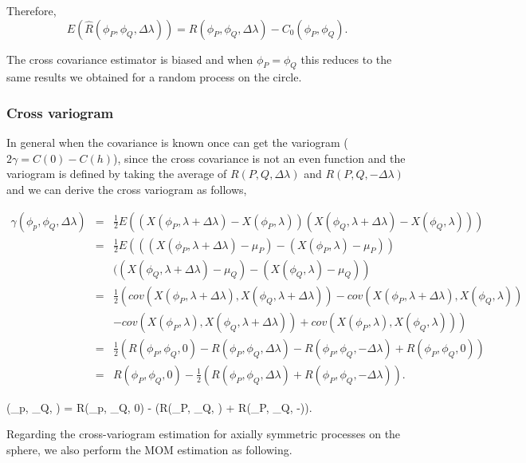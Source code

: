 	Therefore,
	\[
		E(\hat{R}(\phi_P, \phi_Q, \Delta \lambda)) = R(\phi_P, \phi_Q, \Delta \lambda) - C_0 (\phi_P, \phi_Q).
	\]
	
	The cross covariance estimator is biased and  when $\phi_P = \phi_Q$ this reduces to the same results we obtained for a random process on the circle.  
		
	\subsubsection{Cross variogram}
		
	In general when the covariance is known once can get the variogram ($2\gamma = C(0) - C(h)$), since the cross covariance is not an even function and the variogram is defined by taking the average of $R(P,Q, \Delta\lambda)$ and $R(P,Q,-\Delta\lambda)$ and we can derive the cross variogram as follows, 
		
	
	\begin{eqnarray*}
		\gamma(\phi_p, \phi_Q, \Delta\lambda) &=& \frac{1}{2}E\left((X(\phi_P, \lambda+\Delta \lambda) - X(\phi_P, \lambda))(X(\phi_Q, \lambda+\Delta \lambda) - X(\phi_Q, \lambda))\right) \\
		&=& \frac{1}{2} E\left(((X(\phi_P, \lambda+\Delta \lambda) - \mu_P) - (X(\phi_P, \lambda)- \mu_P)) \right. \\
		& & \left.((X(\phi_Q, \lambda+\Delta \lambda) - \mu_Q) - (X(\phi_Q, \lambda) - \mu_Q)\right) \\
		&=& \frac{1}{2} \left(cov(X(\phi_P, \lambda+\Delta \lambda), X(\phi_Q, \lambda+\Delta \lambda)) - cov(X(\phi_P, \lambda+\Delta \lambda), X(\phi_Q, \lambda)) \right. \\
		& & \left. - cov(X(\phi_P, \lambda), X(\phi_Q, \lambda + \Delta \lambda)) + cov(X(\phi_P, \lambda), X(\phi_Q, \lambda))  \right) \\
		&=& \frac{1}{2} \left(R(\phi_P, \phi_Q, 0) - R(\phi_P, \phi_Q, \Delta \lambda) - R(\phi_P, \phi_Q, -\Delta \lambda) + R(\phi_P, \phi_Q, 0)  \right) \\
		&=& R(\phi_P, \phi_Q, 0) - \frac{1}{2}(R(\phi_P, \phi_Q, \Delta \lambda) + R(\phi_P, \phi_Q, -\Delta \lambda)).
	\end{eqnarray*}
	
	\beq
	\gamma(\phi_p, \phi_Q, \Delta\lambda) =  R(\phi_p, \phi_Q, 0) - (R(\phi_P, \phi_Q, \Delta \lambda) + R(\phi_P, \phi_Q, -\Delta \lambda)).
	\eeq 
	
	Regarding the cross-variogram estimation for axially symmetric processes on the sphere, we also perform the MOM estimation as following.
	
